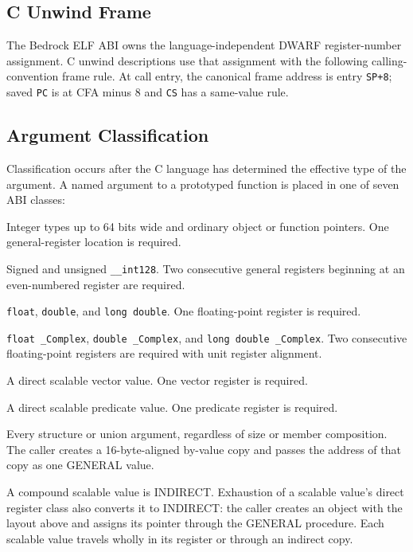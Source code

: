 \documentclass[10pt,twoside]{article}
\begin{document}
\subsection{C Unwind Frame}
The Bedrock ELF ABI owns the language-independent DWARF register-number
assignment. C unwind descriptions use that assignment with the following
calling-convention frame rule.
At call entry, the canonical frame address is entry \texttt{SP+8}; saved
\texttt{PC} is at CFA minus 8 and \texttt{CS} has a same-value rule.

\Needspace{2.4in}
\subsection{Argument Classification}
Classification occurs after the C language has determined the effective type
of the argument. A named argument to a prototyped function is placed in one of
seven ABI classes:

\begin{description}[style=nextline,leftmargin=1.35in,labelwidth=1.25in,itemsep=3pt,topsep=3pt]
\item[GENERAL] Integer types up to 64 bits wide and ordinary object or
function pointers. One general-register location is required.
\item[GENERAL-PAIR] Signed and unsigned \texttt{\_\_int128}. Two consecutive
general registers beginning at an even-numbered register are required.
\item[FLOAT] \texttt{float}, \texttt{double}, and \texttt{long double}. One
floating-point register is required.
\item[FLOAT-PAIR] \texttt{float \_Complex}, \texttt{double \_Complex}, and
\texttt{long double \_Complex}. Two consecutive floating-point registers are
required with unit register alignment.
\item[VECTOR] A direct scalable vector value. One vector register is required.
\item[PREDICATE] A direct scalable predicate value. One predicate register is
required.
\item[INDIRECT] Every structure or union argument, regardless of size or
member composition. The caller creates a 16-byte-aligned by-value copy and
passes the address of that copy as one GENERAL value.
\end{description}

A compound scalable value is INDIRECT. Exhaustion of a scalable value's
direct register class also converts it to INDIRECT: the caller creates an
object with the layout above and assigns its pointer through the GENERAL
procedure. Each scalable value travels wholly in its register or through an
indirect copy.
\end{document}
